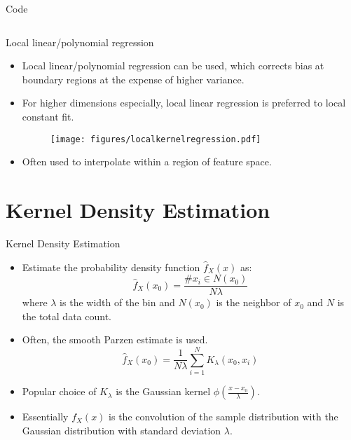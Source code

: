 \documentclass[aspectratio=169]{beamer}
\begin{document}
\begin{frame}[fragile]{Code}
\inputminted{python}{example_knn.py}
\end{frame}


\begin{frame}{Local linear/polynomial regression}
    \begin{itemize}
        \item Local linear/polynomial regression can be used, which corrects bias at boundary regions at the expense of higher variance. 
        \item For higher dimensions especially, local linear regression is preferred to local constant fit.
        \begin{figure}
            \centering
            \texttt{[image: figures/localkernelregression.pdf]}
        \end{figure}
        \item Often used to interpolate within a region of feature space.
    \end{itemize}
\end{frame}


\section{Kernel Density Estimation}


\begin{frame}{Kernel Density Estimation}
    \begin{itemize}
        \item Estimate the probability density function $\hat{f}_X(x)$ as:
        \begin{equation*}
            \hat{f}_X(x_0) = \frac{\# x_i \in N(x_0)}{N\lambda}
        \end{equation*}
        where $\lambda$ is the width of the bin and $N(x_0)$ is the neighbor of $x_0$ and $N$ is the total data count.
        \item Often, the smooth Parzen estimate is used.
        \begin{equation*}
            \hat{f}_X(x_0) = \frac{1}{N\lambda}\sum_{i=1}^{N} K_{\lambda}(x_0, x_i)
        \end{equation*}
        \item Popular choice of $K_{\lambda}$ is the Gaussian kernel $\phi(\frac{x-x_0}{\lambda})$.
        \item Essentially $f_X(x)$ is the convolution of the sample distribution with the Gaussian distribution with standard deviation $\lambda$.
    \end{itemize}
\end{frame}
\end{document}
